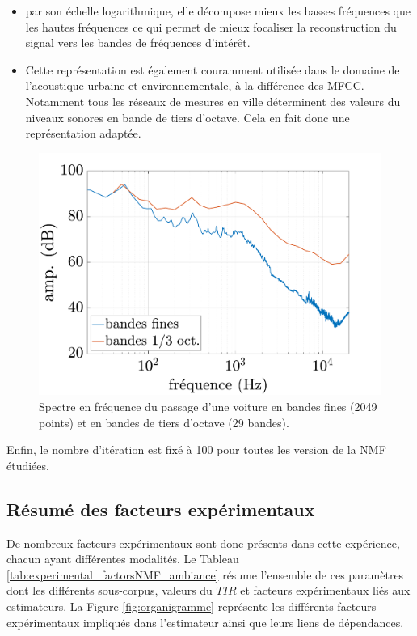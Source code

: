 \begin{itemize}
\item par son échelle logarithmique, elle décompose mieux les basses fréquences que les hautes fréquences ce qui permet de mieux focaliser la reconstruction du signal vers les bandes de fréquences d'intérêt.
\item Cette représentation est également couramment utilisée dans le domaine de l'acoustique urbaine et environnementale, à la différence des MFCC. Notamment tous les réseaux de mesures en ville déterminent des valeurs du niveaux sonores en bande de tiers d'octave. Cela en fait donc une représentation adaptée.
\end{itemize}

\begin{figure}[h]
\centering
\includegraphics[width=0.5\linewidth]{./figures/NMF/bande_fine_tiers.pdf}
\caption{Spectre en fréquence du passage d'une voiture en bandes fines (2049 points) et en bandes de tiers d'octave (29 bandes).}
\label{fig:tiers_octaves}
\end{figure}

Enfin, le nombre d'itération est fixé à 100 pour toutes les version de la NMF étudiées.

\subsection{Résumé des facteurs expérimentaux}

De nombreux facteurs expérimentaux sont donc présents dans cette expérience, chacun ayant différentes modalités. Le Tableau \ref{tab:experimental_factorsNMF_ambiance} résume l'ensemble de ces paramètres dont les différents sous-corpus, valeurs du $TIR$ et facteurs expérimentaux liés aux estimateurs. La Figure \ref{fig:organigramme} représente les différents facteurs expérimentaux impliqués dans l'estimateur ainsi que leurs liens de dépendances.

